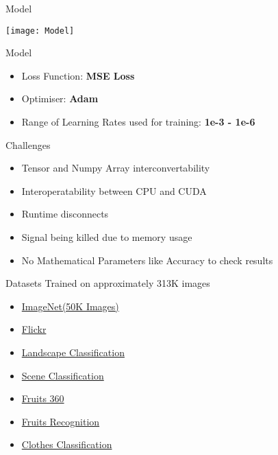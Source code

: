 \documentclass[12pt]{beamer}
\begin{document}
\begin{frame}{Model}
	\begin{center}
		\texttt{[image: Model]}
	\end{center}
\end{frame}

\begin{frame}{Model}
	\begin{itemize}
		\item Loss Function: \textbf{MSE Loss}
		\item Optimiser: \textbf{Adam}
		\item Range of Learning Rates used for training: \textbf{1e-3 - 1e-6}
	\end{itemize}
\end{frame}

\begin{frame}{Challenges}
	\begin{itemize}
		\item Tensor and Numpy Array interconvertability
		\item Interoperatability between CPU and CUDA
		\item Runtime disconnects
		\item Signal being killed due to memory usage
			\pause
		\item No Mathematical Parameters like Accuracy to check results
	\end{itemize}
\end{frame}

\begin{frame}{Datasets}
	Trained on approximately 313K images
	\begin{itemize}
		\item \href{https://www.kaggle.com/lijiyu/imagenet}{ImageNet(50K Images)}\\
		\item \href{https://www.kaggle.com/hsankesara/flickr-image-dataset}{Flickr}\\
		\item \href{https://www.kaggle.com/huseynguliyev/landscape-classification}{Landscape Classification}\\
		\item \href{https://www.kaggle.com/nitishabharathi/scene-classification}{Scene Classification}\\
		\item \href{https://www.kaggle.com/moltean/fruits}{Fruits 360}\\
		\item \href{https://www.kaggle.com/chrisfilo/fruit-recognition}{Fruits Recognition}\\
		\item \href{https://www.kaggle.com/salil007/caavo}{Clothes Classification}\\
	\end{itemize}
\end{frame}
\end{document}
